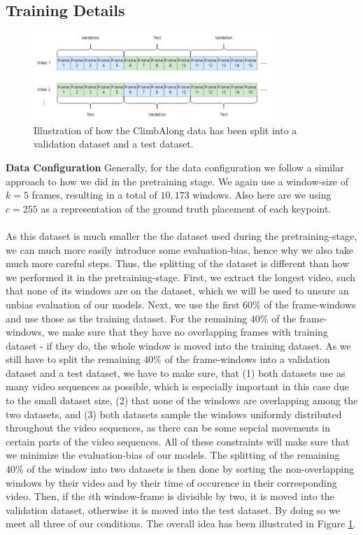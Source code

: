 \documentclass[./main.tex]{subfiles}
\begin{document}
\subsection{Training Details}
\label{sec:pretrain_details}
\begin{figure}[htbp]
    \centering
    \includegraphics[width=0.8\textwidth]{entities/CA_splitting.png}
    \caption{Illustration of how the ClimbAlong data has been split into a validation dataset and a test dataset.}
    \label{fig:CA_splitting}
\end{figure}
\noindent \textbf{Data Configuration} Generally, for the data configuration we follow a similar approach to how we did in the pretraining stage. We again use a window-size of $k = 5$ frames, resulting in a total of $10,173$ windows. Also here are we using $c = 255$ as a representation of the ground truth placement of each keypoint. 
\\
\\
As this dataset is much smaller the the dataset used during the pretraining-stage, we can much more easily introduce some evaluation-bias, hence why we also take much more careful steps. Thus, the splitting of the dataset is different than how we performed it in the pretraining-stage. First, we extract the longest video, such that none of its windows are on the dataset, which we will be used to unsure an unbias evaluation of our models. Next, we use the first $60\%$ of the frame-windows and use those as the training dataset. For the remaining $40\%$ of the frame-windows, we make sure that they have no overlapping frames with training dataset - if they do, the whole window is moved into the training dataset. As we still have to split the remaining $40\%$ of the frame-windows into a validation dataset and a test dataset, we have to make sure, that (1) both datasets use as many video sequences as possible, which is especially important in this case due to the small dataset size, (2) that none of the windows are overlapping among the two datasets, and (3) both datasets sample the windows uniformly distributed throughout the video sequences, as there can be some sepcial movements in certain parts of the video sequences. All of these constraints will make sure that we minimize the evaluation-bias of our models. The splitting of the remaining $40\%$ of the window into two datasets is then done by sorting the non-overlapping windows by their video and by their time of occurence in their corresponding video. Then, if the $i$th window-frame is divisible by two, it is moved into the validation dataset, otherwise it is moved into the test dataset. By doing so we meet all three of our conditions. The overall idea has been illustrated in Figure \ref{fig:CA_splitting}.
\end{document}
